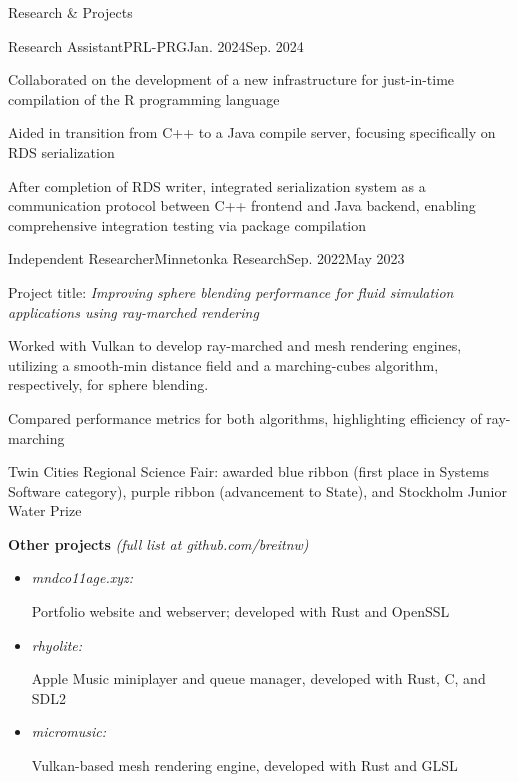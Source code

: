 \documentclass{resume} %
\begin{document}
\begin{rSection}{Research \& Projects}
  \begin{rItem}{Research Assistant}{PRL-PRG}{Jan. 2024}{Sep. 2024}
    \item Collaborated on the development of a new infrastructure for just-in-time compilation of the R programming language
    \item Aided in transition from C++ to a Java compile server, focusing specifically on RDS serialization
    \item After completion of RDS writer, integrated serialization system as a communication protocol between C++ frontend and
    Java backend, enabling comprehensive integration testing via package compilation  \end{rItem}

  \begin{rItem}{Independent Researcher}{Minnetonka Research}{Sep. 2022}{May 2023}
    \item Project title: {\em Improving sphere blending performance for fluid simulation applications using ray-marched rendering}
    \item Worked with Vulkan to develop ray-marched and mesh rendering engines, utilizing a smooth-min distance field and a marching-cubes algorithm, respectively, for sphere blending.
    \item Compared performance metrics for both algorithms, highlighting efficiency of ray-marching
    \item Twin Cities Regional Science Fair: awarded blue ribbon (first place in Systems Software category), purple ribbon (advancement to State), and Stockholm Junior Water Prize
  \end{rItem}

  {\bf Other projects} {\em (full list at github.com/breitnw)}
  \begin{itemize}
    \item \parbox{3cm}{\em mndco11age.xyz:} Portfolio website and webserver; developed with Rust and OpenSSL
    \item \parbox{3cm}{\em rhyolite:} Apple Music miniplayer and queue manager, developed with Rust, C, and SDL2
    \item \parbox{3cm}{\em micromusic:} Vulkan-based mesh rendering engine, developed with Rust and GLSL
  \end{itemize}

\end{rSection}
\end{document}
